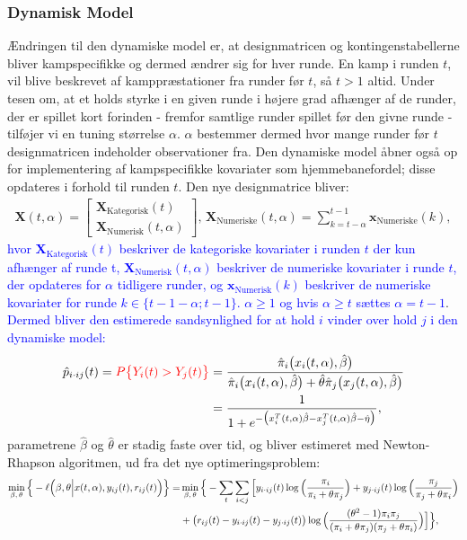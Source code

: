 \documentclass[11pt,a4paper]{article}
\begin{document}
\subsubsection{Dynamisk Model}
Ændringen til den dynamiske model er, at designmatricen og kontingenstabellerne bliver kampspecifikke og dermed ændrer sig for hver runde. En kamp i runden $t$, vil blive beskrevet af kamppræstationer fra runder før $t$, så $t>1$ altid. Under tesen om, at et holds styrke i en given runde i højere grad afhænger af de runder, der er spillet kort forinden - fremfor samtlige runder spillet før den givne runde - tilføjer vi en tuning størrelse $\alpha$. $\alpha$ bestemmer dermed hvor mange runder før $t$ designmatricen indeholder observationer fra. Den dynamiske model åbner også op for implementering af kampspecifikke kovariater som hjemmebanefordel; disse opdateres i forhold til runden $t$. Den nye designmatrice bliver:
\begin{align*}
\textbf{X}(t,\alpha)=\begin{bmatrix}
\textbf{X}_{\text{Kategorisk}}(t)\\
\textbf{X}_{\text{Numerisk}}(t,\alpha)
\end{bmatrix}\text{,   }\textbf{X}_{\text{Numeriske}}(t,\alpha)=\sum_{k=t-\alpha}^{t-1}\textbf{x}_{\text{Numeriske}}(k),
\end{align*}
\textcolor{blue}{hvor $\textbf{X}_{\text{Kategorisk}}(t)$ beskriver de kategoriske kovariater i runden $t$ der kun afhænger af runde t, $\textbf{X}_{\text{Numerisk}}(t,\alpha)$ beskriver de numeriske kovariater i runde $t$, der opdateres for $\alpha$ tidligere runder, og $\textbf{x}_{\text{Numerisk}}(k)$ beskriver de numeriske kovariater for runde $k\in \{t-1-\alpha;t-1\}$. $\alpha\geq1$ og hvis $\alpha\geq t$ sættes $\alpha=t-1$}.
\textcolor{blue}{Dermed bliver den estimerede sandsynlighed for at hold $i$ vinder over hold $j$ i den dynamiske model:}
\begin{align*}
\hat{p}_{i\cdot ij}(t)=\textcolor{red}{P\big{\{}Y_{i}(t)>Y_{j}(t)\big{\}}}&=\frac{\hat{\pi}_i\big{(}x_i(t,\alpha),\hat{\beta}\big{)}}{\hat{\pi}_i\big{(}x_i(t,\alpha),\hat{\beta}\big{)}+\hat{\theta}\hat{\pi}_j\big{(}x_j(t,\alpha),\hat{\beta}\big{)}}\\
&=\frac{1}{1+e^{-\big{(}x_i^T(t,\alpha)\hat{\beta}-x_j^T(t,\alpha)\hat{\beta}-\hat{\eta}\big{)}}},
\end{align*}
parametrene $\hat{\beta}$ og $\hat{\theta}$ er stadig faste over tid, og bliver estimeret med Newton-Rhapson algoritmen, ud fra det nye optimeringsproblem:
\begin{align*}
\min_{\beta,\,\theta} \Big{\{}-\ell\Big{(}\beta,\theta\Big{|}x(t,\alpha),y_{ij}(t),r_{ij}(t)\Big{)}\Big{\}}=&\min_{\beta,\,\theta} \Big{\{}- \sum_{t}\sum_{i<j}\Big{[}y_{i\cdot ij}(t)\log\Big{(}\frac{\pi_i}{\pi_i+\theta\pi_j}\Big{)}
+ y_{j\cdot ij}(t)\log\Big{(}\frac{\pi_j}{\pi_j+\theta\pi_i}\Big{)}\\
&+ \big{(}r_{ij}(t)-y_{i\cdot ij}(t)-y_{j\cdot ij}(t)\big{)} \log\Big{(}\frac{(\theta^2-1)\pi_i \pi_j}{(\pi_i+\theta\pi_j)(\pi_j+\theta\pi_i)}\Big{)}\Big{]}\Big{\}},
\end{align*}
\end{document}
